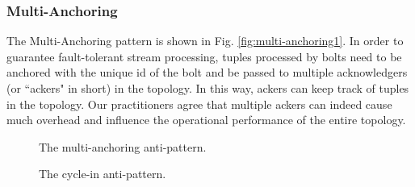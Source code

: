 \documentclass[smallextended]{svjour3}       %
\begin{document}
\subsubsection{Multi-Anchoring}
The Multi-Anchoring pattern is shown in Fig. \ref{fig:multi-anchoring1}. In order to guarantee fault-tolerant stream processing, tuples processed by bolts need to be anchored with the unique {\sf id} of the bolt and be passed to multiple acknowledgers (or ``ackers" in short) in the topology. In this way, ackers can keep track of tuples in the topology. Our practitioners agree that multiple ackers can indeed cause much overhead and influence the operational performance of the entire topology.


\begin{figure}
\centering 
{}\caption{The multi-anchoring anti-pattern.}\label{fig:multi-anchoring1}
\caption{The cycle-in anti-pattern.}\label{fig:cycle1}
\end{figure}
\end{document}
